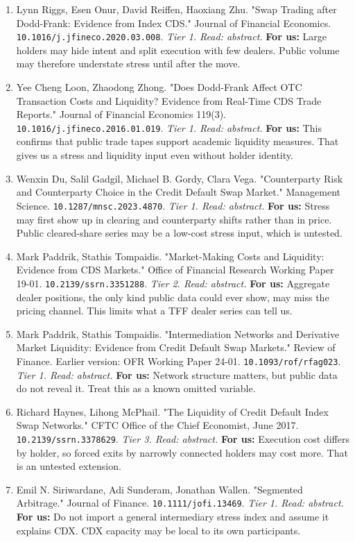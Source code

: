 \begin{enumerate}[leftmargin=*,itemsep=3pt]
\item Lynn Riggs, Esen Onur, David Reiffen, Haoxiang Zhu. "Swap Trading after Dodd-Frank: Evidence from Index CDS." Journal of Financial Economics. \nolinkurl{10.1016/j.jfineco.2020.03.008}. \emph{Tier 1. Read: abstract.} \textbf{For us:} Large holders may hide intent and split execution with few dealers. Public volume may therefore understate stress until after the move.
\item Yee Cheng Loon, Zhaodong Zhong. "Does Dodd-Frank Affect OTC Transaction Costs and Liquidity? Evidence from Real-Time CDS Trade Reports." Journal of Financial Economics 119(3). \nolinkurl{10.1016/j.jfineco.2016.01.019}. \emph{Tier 1. Read: abstract.} \textbf{For us:} This confirms that public trade tapes support academic liquidity measures. That gives us a stress and liquidity input even without holder identity.
\item Wenxin Du, Salil Gadgil, Michael B. Gordy, Clara Vega. "Counterparty Risk and Counterparty Choice in the Credit Default Swap Market." Management Science. \nolinkurl{10.1287/mnsc.2023.4870}. \emph{Tier 1. Read: abstract.} \textbf{For us:} Stress may first show up in clearing and counterparty shifts rather than in price. Public cleared-share series may be a low-cost stress input, which is untested.
\item Mark Paddrik, Stathis Tompaidis. "Market-Making Costs and Liquidity: Evidence from CDS Markets." Office of Financial Research Working Paper 19-01. \nolinkurl{10.2139/ssrn.3351288}. \emph{Tier 2. Read: abstract.} \textbf{For us:} Aggregate dealer positions, the only kind public data could ever show, may miss the pricing channel. This limits what a TFF dealer series can tell us.
\item Mark Paddrik, Stathis Tompaidis. "Intermediation Networks and Derivative Market Liquidity: Evidence from Credit Default Swap Markets." Review of Finance. Earlier version: OFR Working Paper 24-01. \nolinkurl{10.1093/rof/rfag023}. \emph{Tier 1. Read: abstract.} \textbf{For us:} Network structure matters, but public data do not reveal it. Treat this as a known omitted variable.
\item Richard Haynes, Lihong McPhail. "The Liquidity of Credit Default Index Swap Networks." CFTC Office of the Chief Economist, June 2017. \nolinkurl{10.2139/ssrn.3378629}. \emph{Tier 3. Read: abstract.} \textbf{For us:} Execution cost differs by holder, so forced exits by narrowly connected holders may cost more. That is an untested extension.
\item Emil N. Siriwardane, Adi Sunderam, Jonathan Wallen. "Segmented Arbitrage." Journal of Finance. \nolinkurl{10.1111/jofi.13469}. \emph{Tier 1. Read: abstract.} \textbf{For us:} Do not import a general intermediary stress index and assume it explains CDX. CDX capacity may be local to its own participants.

\end{enumerate}

